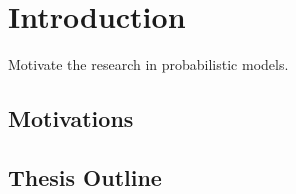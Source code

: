\chapter{Introduction}
\label{chapter1}
Motivate the research in probabilistic models.

\section{Motivations}
\label{section1.1}


\section{Thesis Outline}
\label{section1.3}
\cite{liu2019dominant}

